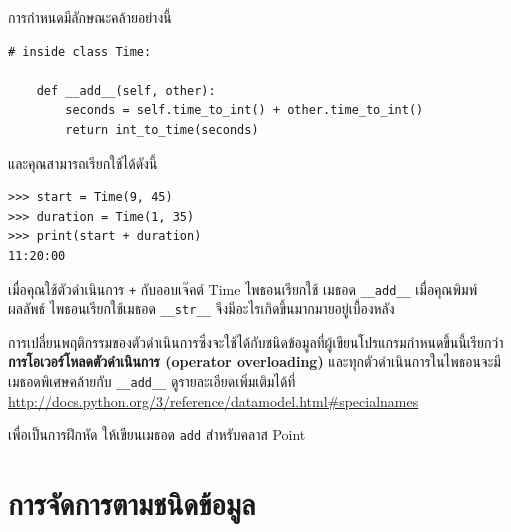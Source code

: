 
การกำหนดมีลักษณะคล้ายอย่างนี้

\begin{verbatim}
# inside class Time:

    def __add__(self, other):
        seconds = self.time_to_int() + other.time_to_int()
        return int_to_time(seconds)
\end{verbatim}
%

และคุณสามารถเรียกใช้ได้ดังนี้

\begin{verbatim}
>>> start = Time(9, 45)
>>> duration = Time(1, 35)
>>> print(start + duration)
11:20:00
\end{verbatim}
%

เมื่อคุณใช้ตัวดำเนินการ {\tt +} กับออบเจ๊คต์ Time ไพธอนเรียกใช้ เมธอด \verb"__add__"
เมื่อคุณพิมพ์ผลลัพธ์ ไพธอนเรียกใช้เมธอด \verb"__str__" จึงมีอะไรเกิดขึ้นมากมายอยู่เบื้องหลัง


การเปลี่ยนพฤติกรรมของตัวดำเนินการซึ่งจะใช้ได้กับชนิดข้อมูลที่ผู้เขียนโปรแกรมกำหนดขึ้นนี้เรียกว่า {\bf การโอเวอร์โหลดตัวดำเนินการ (operator overloading)}
และทุกตัวดำเนินการในไพธอนจะมีเมธอดพิเศษคล้ายกับ \verb"__add__" ดูรายละเอียดเพิ่มเติมได้ที่ 
\url{http://docs.python.org/3/reference/datamodel.html#specialnames}



เพื่อเป็นการฝึกหัด ให้เขียนเมธอด {\tt add} สำหรับคลาส Point

\section{การจัดการตามชนิดข้อมูล} %


